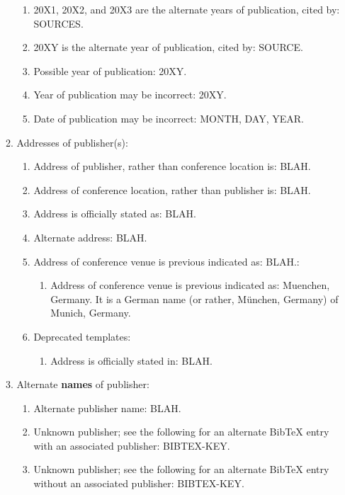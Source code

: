 \documentclass[letter,12pt]{article}
\begin{document}
\begin{enumerate}
\begin{enumerate}
\begin{enumerate}
		\item 20X1, 20X2, and 20X3 are the alternate years of publication, cited by: SOURCES.
		\item 20XY is the alternate year of publication, cited by: SOURCE.
		\item Possible year of publication: 20XY.
		\item Year of publication may be incorrect: 20XY.
		\item Date of publication may be incorrect: MONTH, DAY, YEAR.
		\end{enumerate}
	\item Addresses of publisher(s): \vspace{-0.2cm}
		\begin{enumerate} \itemsep -2pt
		\item Address of publisher, rather than conference location is: BLAH.
		\item Address of conference location, rather than publisher is: BLAH.
		\item Address is officially stated as: BLAH.
		\item Alternate address: BLAH.
		\item Address of conference venue is previous indicated as: BLAH.: \vspace{-0.1cm}
			\begin{enumerate} \itemsep -1pt
			\item Address of conference venue is previous indicated as: Muenchen, Germany. It is a German name (or rather, M{\"{u}}nchen, Germany) of Munich, Germany.
			\end{enumerate}
		\item Deprecated templates: \vspace{-0.1cm}
			\begin{enumerate} \itemsep -1pt
			\item Address is officially stated in: BLAH.
			\end{enumerate}
		\end{enumerate}
	\item Alternate {\bf names} of publisher: \vspace{-0.2cm}
		\begin{enumerate} \itemsep -2pt
		\item Alternate publisher name: BLAH.
		\item Unknown publisher; see the following for an alternate BibTeX entry with an associated publisher: BIBTEX-KEY.
		\item Unknown publisher; see the following for an alternate BibTeX entry without an associated publisher: BIBTEX-KEY.

\end{enumerate}
\end{enumerate}
\end{enumerate}
\end{document}
